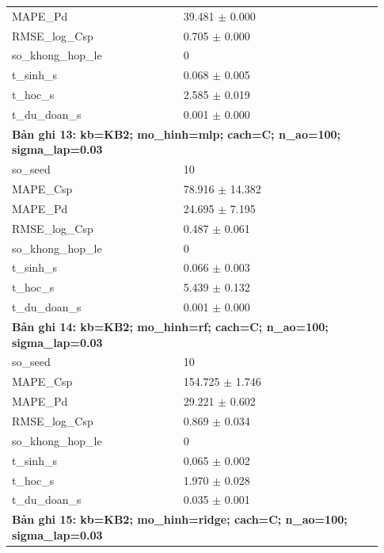 \begin{longtable}{p{0.43\linewidth}p{0.50\linewidth}}
MAPE\_\allowbreak Pd & 39.481 $\pm$ 0.000 \\
RMSE\_\allowbreak log\_\allowbreak Csp & 0.705 $\pm$ 0.000 \\
so\_\allowbreak khong\_\allowbreak hop\_\allowbreak le & 0 \\
t\_\allowbreak sinh\_\allowbreak s & 0.068 $\pm$ 0.005 \\
t\_\allowbreak hoc\_\allowbreak s & 2.585 $\pm$ 0.019 \\
t\_\allowbreak du\_\allowbreak doan\_\allowbreak s & 0.001 $\pm$ 0.000 \\
\midrule
\multicolumn{2}{p{0.95\linewidth}}{\textbf{Bản ghi 13: kb=KB2; mo\_hinh=mlp; cach=C; n\_ao=100; sigma\_lap=0.03}} \\
so\_\allowbreak seed & 10 \\
MAPE\_\allowbreak Csp & 78.916 $\pm$ 14.382 \\
MAPE\_\allowbreak Pd & 24.695 $\pm$ 7.195 \\
RMSE\_\allowbreak log\_\allowbreak Csp & 0.487 $\pm$ 0.061 \\
so\_\allowbreak khong\_\allowbreak hop\_\allowbreak le & 0 \\
t\_\allowbreak sinh\_\allowbreak s & 0.066 $\pm$ 0.003 \\
t\_\allowbreak hoc\_\allowbreak s & 5.439 $\pm$ 0.132 \\
t\_\allowbreak du\_\allowbreak doan\_\allowbreak s & 0.001 $\pm$ 0.000 \\
\midrule
\multicolumn{2}{p{0.95\linewidth}}{\textbf{Bản ghi 14: kb=KB2; mo\_hinh=rf; cach=C; n\_ao=100; sigma\_lap=0.03}} \\
so\_\allowbreak seed & 10 \\
MAPE\_\allowbreak Csp & 154.725 $\pm$ 1.746 \\
MAPE\_\allowbreak Pd & 29.221 $\pm$ 0.602 \\
RMSE\_\allowbreak log\_\allowbreak Csp & 0.869 $\pm$ 0.034 \\
so\_\allowbreak khong\_\allowbreak hop\_\allowbreak le & 0 \\
t\_\allowbreak sinh\_\allowbreak s & 0.065 $\pm$ 0.002 \\
t\_\allowbreak hoc\_\allowbreak s & 1.970 $\pm$ 0.028 \\
t\_\allowbreak du\_\allowbreak doan\_\allowbreak s & 0.035 $\pm$ 0.001 \\
\midrule
\multicolumn{2}{p{0.95\linewidth}}{\textbf{Bản ghi 15: kb=KB2; mo\_hinh=ridge; cach=C; n\_ao=100; sigma\_lap=0.03}} \\

\end{longtable}
